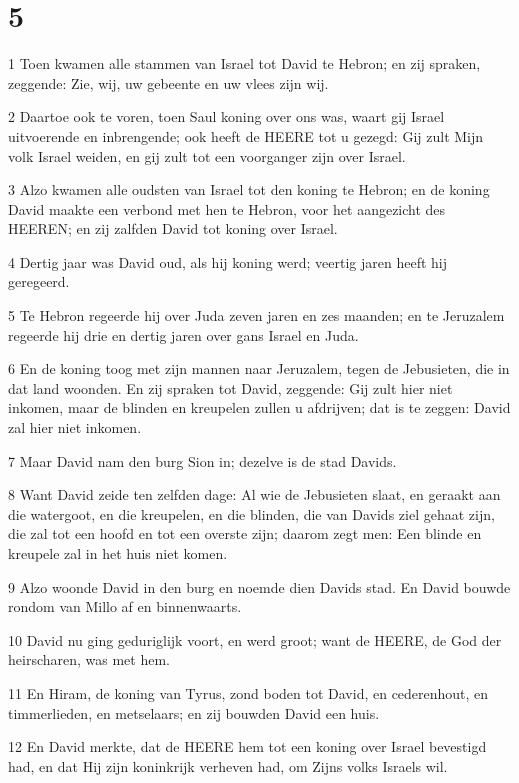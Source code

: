 \chapter{5}

\par 1 Toen kwamen alle stammen van Israel tot David te Hebron; en zij spraken, zeggende: Zie, wij, uw gebeente en uw vlees zijn wij.
\par 2 Daartoe ook te voren, toen Saul koning over ons was, waart gij Israel uitvoerende en inbrengende; ook heeft de HEERE tot u gezegd: Gij zult Mijn volk Israel weiden, en gij zult tot een voorganger zijn over Israel.
\par 3 Alzo kwamen alle oudsten van Israel tot den koning te Hebron; en de koning David maakte een verbond met hen te Hebron, voor het aangezicht des HEEREN; en zij zalfden David tot koning over Israel.
\par 4 Dertig jaar was David oud, als hij koning werd; veertig jaren heeft hij geregeerd.
\par 5 Te Hebron regeerde hij over Juda zeven jaren en zes maanden; en te Jeruzalem regeerde hij drie en dertig jaren over gans Israel en Juda.
\par 6 En de koning toog met zijn mannen naar Jeruzalem, tegen de Jebusieten, die in dat land woonden. En zij spraken tot David, zeggende: Gij zult hier niet inkomen, maar de blinden en kreupelen zullen u afdrijven; dat is te zeggen: David zal hier niet inkomen.
\par 7 Maar David nam den burg Sion in; dezelve is de stad Davids.
\par 8 Want David zeide ten zelfden dage: Al wie de Jebusieten slaat, en geraakt aan die watergoot, en die kreupelen, en die blinden, die van Davids ziel gehaat zijn, die zal tot een hoofd en tot een overste zijn; daarom zegt men: Een blinde en kreupele zal in het huis niet komen.
\par 9 Alzo woonde David in den burg en noemde dien Davids stad. En David bouwde rondom van Millo af en binnenwaarts.
\par 10 David nu ging geduriglijk voort, en werd groot; want de HEERE, de God der heirscharen, was met hem.
\par 11 En Hiram, de koning van Tyrus, zond boden tot David, en cederenhout, en timmerlieden, en metselaars; en zij bouwden David een huis.
\par 12 En David merkte, dat de HEERE hem tot een koning over Israel bevestigd had, en dat Hij zijn koninkrijk verheven had, om Zijns volks Israels wil.

